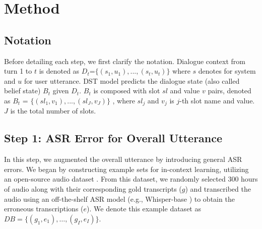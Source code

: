 \vspace{-2pt}
\section{Method}
\vspace{-3pt}

\subsection{Notation}
Before detailing each step, we first clarify the notation. Dialogue context from turn 1 to $t$ is denoted as $D_t$=$\{(s_1, u_1 ),..., ( s_t, u_t )\}$ where $s$ denotes for system and $u$ for user utterance. DST model predicts the dialogue state (also called belief state) $B_t$ given $D_t$. $B_t$ is composed with slot $sl$ and value $v$  pairs, denoted as $B_t$ = $\{( {sl}_1, v_1 ),..., ( {sl}_J, v_J )\}$ , where ${sl}_j$ and $v_j$ is $j$-th slot name and value. $J$ is the total number of slots.

\subsection{Step 1: ASR Error for Overall Utterance}
\label{sec:method_step1}
In this step, we augmented the overall utterance by introducing general ASR errors. We began by constructing example sets for in-context learning, utilizing an open-source audio dataset \cite{ardila-etal-2020-common}. From this dataset, we randomly selected 300 hours of audio along with their corresponding gold transcripts ($g$) and transcribed the audio using an off-the-shelf ASR model (e.g., Whisper-base \cite{whisper}) to obtain the erroneous transcriptions ($e$). We denote this example dataset as $DB = \{(g_1, e_1), \ldots, (g_I, e_I)\}$.



